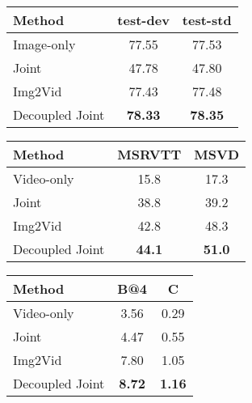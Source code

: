 \documentclass{article}
\begin{document}
\begin{table*}[!ht]
\begin{minipage}[t]{0.3\linewidth}
\small
\setlength\tabcolsep{1pt}
    \begin{tabular*}{\linewidth}{@{\extracolsep{\fill}}lcc@{}}
    \toprule
    \textbf{Method} & \textbf{test-dev} & \textbf{test-std} \\
    \midrule
    Image-only & 77.55 & 77.53 \\
    Joint & 47.78 & 47.80\\
    Img2Vid & 77.43 & 77.48 \\
    Decoupled Joint & \textbf{78.33} & \textbf{78.35} \\
  \bottomrule
\end{tabular*}
\end{minipage}
\hfill 
\begin{minipage}[t]{0.33\linewidth}
\small
  \renewcommand{\arraystretch}{1.1}
  \setlength\tabcolsep{1pt}
    \begin{tabular*}{\linewidth}{@{\extracolsep{\fill}}lcc@{}}
    \toprule
    \textbf{Method} & \textbf{MSRVTT} & \textbf{MSVD} \\
    \midrule
    Video-only & 15.8 & 17.3\\
    Joint & 38.8 & 39.2 \\
    Img2Vid & 42.8	& 48.3\\
    Decoupled Joint & \textbf{44.1} & \textbf{51.0} \\
  \bottomrule
\end{tabular*}
\end{minipage}
\hfill 
\begin{minipage}[t]{0.3\linewidth}
\small
  \renewcommand{\arraystretch}{1.1}
  \setlength\tabcolsep{1pt}
    \begin{tabular*}{\linewidth}{@{\extracolsep{\fill}}lcc@{}}
    \toprule
    \textbf{Method} & \textbf{B@4} & \textbf{C} \\
    \midrule
    Video-only & 3.56 & 0.29 \\
    Joint & 4.47 & 0.55 \\
    Img2Vid & 7.80 & 1.05 \\
    Decoupled Joint &  \textbf{8.72} & \textbf{1.16} \\
  \bottomrule
\end{tabular*}
\end{minipage}
\end{table*}
\end{document}
